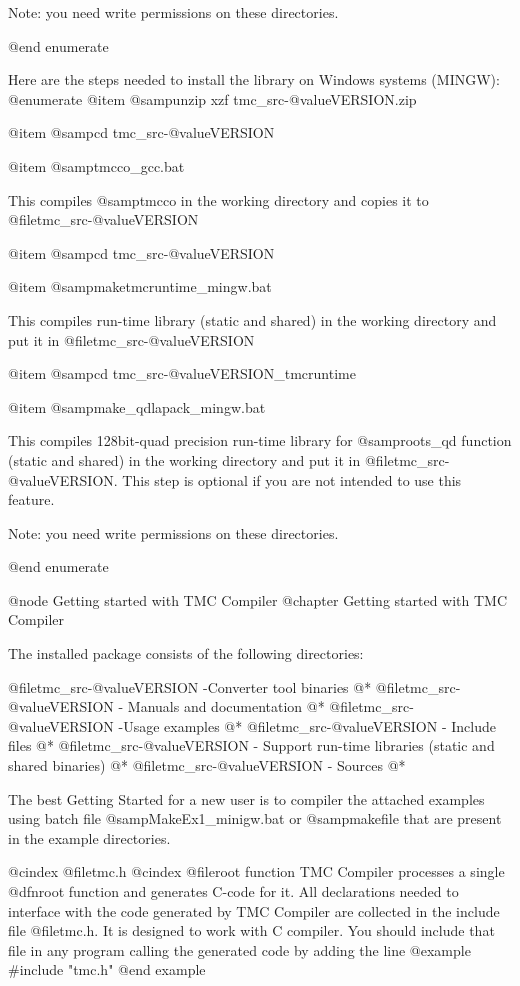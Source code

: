 Note: you need write permissions on these directories.

@end enumerate

Here are the steps needed to install the library on Windows systems (MINGW):
@enumerate
@item
@samp{unzip xzf tmc_src-@value{VERSION}.zip}

@item
@samp{cd tmc_src-@value{VERSION}\src\tmcwood}

@item
@samp{tmcco_gcc.bat}

This compiles @samp{tmcco} in the working directory and copies it to @file{tmc_src-@value{VERSION}\bin}

@item
@samp{cd tmc_src-@value{VERSION}\src\tmcruntime}

@item
@samp{maketmcruntime_mingw.bat}

This compiles run-time library (static and shared) in the working directory and put it in @file{tmc_src-@value{VERSION}\lib}

@item
@samp{cd tmc_src-@value{VERSION}\src\qdlapack_tmcruntime}

@item
@samp{make_qdlapack_mingw.bat}

This compiles 128bit-quad precision run-time library for  @samp{roots_qd}  function (static and shared) in the working directory and put it in @file{tmc_src-@value{VERSION}\lib}. This step is optional if you are not intended to use this feature.

Note: you need write permissions on these directories.

@end enumerate


@node Getting started with TMC Compiler
@chapter Getting started with TMC Compiler

The installed package consists of the following directories:

@file{tmc_src-@value{VERSION}\bin} -Converter tool binaries @*
@file{tmc_src-@value{VERSION}\doc} - Manuals and documentation @*
@file{tmc_src-@value{VERSION}\examples} -Usage examples @*
@file{tmc_src-@value{VERSION}} - Include files @*
@file{tmc_src-@value{VERSION}\lib} - Support run-time libraries (static and shared binaries) @*
@file{tmc_src-@value{VERSION}\src} - Sources @*

The best Getting Started for a new user is to compiler the attached examples using batch file @samp{MakeEx1_minigw.bat} or @samp{makefile} that are present in the example directories. 

@cindex @file{tmc.h}
@cindex @file{root function}
TMC Compiler processes a single @dfn{root function}  and generates C-code for it. 
All declarations needed to interface with the code generated by TMC Compiler  are collected in the include file
@file{tmc.h}.  It is designed to work with  C   compiler.
You should include that file in any program calling the generated code 
by adding the line
@example
   #include "tmc.h"
@end example

